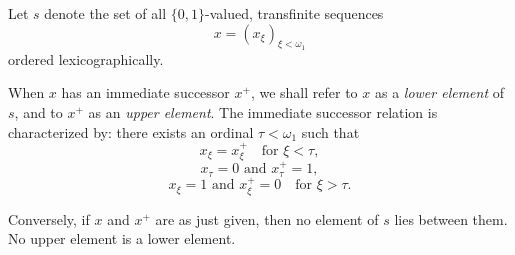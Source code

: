 Let $s$ denote the set of all $\{0, 1\}$-valued, transfinite sequences
$$x = (x_\xi)_{\xi < \omega_1}$$
ordered lexicographically.

When $x$ has an immediate successor $x^+$, we shall refer to $x$ as a \emph{lower element} of $s$, and to $x^+$ as an \emph{upper element}. The immediate successor relation is characterized by: there exists an ordinal $\tau < \omega_1$ such that
$$x_\xi = x^+_\xi \quad \text{for } \xi < \tau,$$
$$x_\tau = 0 \text{ and } x^+_\tau = 1,$$
$$x_\xi = 1 \text{ and } x^+_\xi = 0 \quad \text{for } \xi > \tau.$$

Conversely, if $x$ and $x^+$ are as just given, then no element of $s$ lies between them. No upper element is a lower element.
